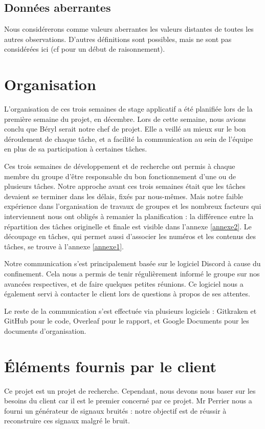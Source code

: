 \documentclass[a4paper,12pt]{article} %
\begin{document}
		\subsection{Données aberrantes}
		    Nous considérerons comme valeurs aberrantes les valeurs distantes de toutes les autres observations. D'autres définitions sont possibles, mais ne sont pas considérées ici (cf \cite{DES} pour un début de raisonnement).
		    
	\section{\label{orga}Organisation}
	    L'organisation de ces trois semaines de stage applicatif a été planifiée lors de la première semaine du projet, en décembre.
        Lors de cette semaine, nous avions conclu que Béryl serait notre chef de projet. Elle a veillé au mieux sur le bon déroulement de chaque tâche, et a facilité la communication au sein de l'équipe en plus de sa participation à certaines tâches.
    
        Ces trois semaines de développement et de recherche ont permis à chaque membre du groupe d'être responsable du bon fonctionnement d'une ou de plusieurs tâches. Notre approche avant ces trois semaines était que les tâches devaient se terminer dans les délais, fixés par nous-mêmes.
        Mais notre faible expérience dans l'organisation de travaux de groupes et les nombreux facteurs qui interviennent nous ont obligés à remanier la planification : la différence entre la répartition des tâches originelle et finale est visible dans l'annexe \ref{annexe2}. Le découpage en tâches, qui permet aussi d'associer les numéros et les contenus des tâches, se trouve à l'annexe \ref{annexe1}.
        
        Notre communication s'est principalement basée sur le logiciel Discord \cite{discord} à cause du confinement. Cela nous a permis de tenir régulièrement informé le groupe sur nos avancées respectives, et de faire quelques petites réunions. Ce logiciel nous a également servi à contacter le client lors de questions à propos de ses attentes.
        
        Le reste de la communication s'est effectuée via plusieurs logiciels : Gitkraken \cite{gitkraken} et GitHub \cite{github} pour le code, Overleaf \cite{overleaf} pour le rapport, et Google Documents \cite{drive} pour les documents d'organisation.
        
	\section{Éléments fournis par le client}
	    Ce projet est un projet de recherche. Cependant, nous devons nous baser sur les besoins du client car il est le premier concerné par ce projet. Mr Perrier nous a fourni un générateur de signaux bruités : notre objectif est de réussir à reconstruire ces signaux malgré le bruit. 
	    
\end{document}
